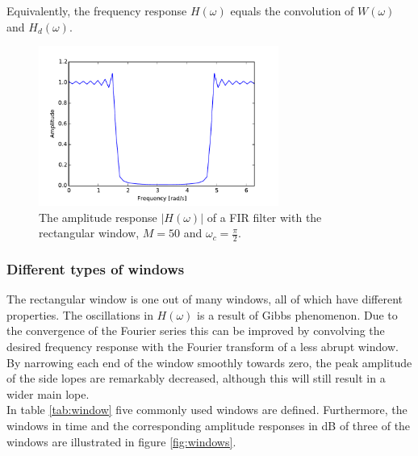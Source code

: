 Equivalently, the frequency response $H(\omega)$ equals the convolution of $W(\omega)$ and $H_d(\omega)$. 

\begin{figure}[H]
\centering
\includegraphics[width=0.7\textwidth]{figures/filter_teori/lowpass_real.pdf}
\caption{The amplitude response $|H(\omega)|$ of a FIR filter with the rectangular window, $M = 50$ and $\omega_c = \frac{\pi}{2}$.}
\label{fig:lowpass_real}
\end{figure}

\subsubsection{Different types of windows}
The rectangular window is one out of many windows, all of which have different properties. The oscillations in $H(\omega)$ is a result of Gibbs phenomenon. Due to the convergence of the Fourier series this can be improved by convolving the desired frequency response with the Fourier transform of a less abrupt window. By narrowing each end of the window smoothly towards zero, the peak amplitude of the side lopes are remarkably decreased, although this will still result in a wider main lope. \\
In table \ref{tab:window} five commonly used windows are defined. Furthermore, the windows in time and the corresponding amplitude responses in dB of three of the windows are illustrated in figure \ref{fig:windows}.

